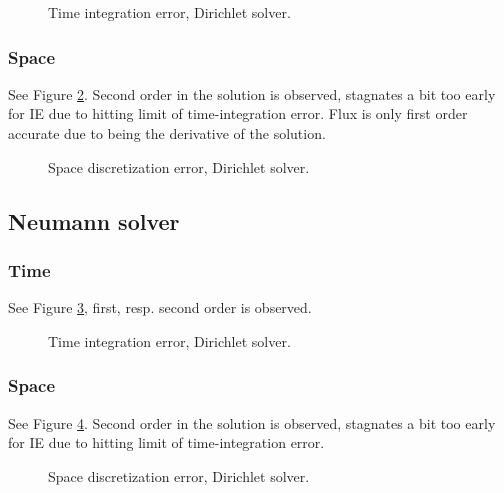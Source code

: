 \documentclass[a4paper,10pt]{article}
\begin{document}
\begin{figure}[ht!]
\label{FIG D TIME}
\caption{Time integration error, Dirichlet solver.}
\end{figure}
% 
\FloatBarrier
\subsubsection{Space}
See Figure \ref{FIG D SPACE}. Second order in the solution is observed, stagnates a bit too early for IE due to hitting limit of time-integration error. Flux is only first order accurate due to being the derivative of the solution.

\begin{figure}[ht!]
\label{FIG D SPACE}
\caption{Space discretization error, Dirichlet solver.}
\end{figure}

\FloatBarrier
\subsection{Neumann solver}
% 
\FloatBarrier
\subsubsection{Time}
See Figure \ref{FIG N TIME}, first, resp. second order is observed.

\begin{figure}[ht!]
\label{FIG N TIME}
\caption{Time integration error, Dirichlet solver.}
\end{figure}
% 
\FloatBarrier
\subsubsection{Space}
See Figure \ref{FIG N SPACE}. Second order in the solution is observed, stagnates a bit too early for IE due to hitting limit of time-integration error.

\begin{figure}[ht!]
\label{FIG N SPACE}
\caption{Space discretization error, Dirichlet solver.}
\end{figure}
% 
\FloatBarrier
\end{document}
